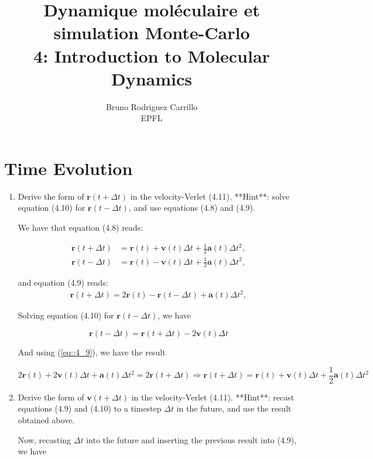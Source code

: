 \documentclass[12pt,letterpaper]{report}
\title{ Dynamique moléculaire et simulation Monte-Carlo \\ 4: Introduction to Molecular Dynamics}
\author{Bruno Rodriguez Carrillo \\ EPFL}
\begin{document}
	
	\maketitle
	\section*{Time Evolution}
		
	\begin{enumerate}
		\item 
		Derive the form of $\mathbf{r}(t + \Delta t)$ in the velocity-Verlet (4.11). **Hint**: solve equation (4.10) for  $\mathbf{r}(t - \Delta t)$, and use equations (4.8) and (4.9).
		
		We have that equation (4.8) reads: 
		
		\begin{align}				
			\mathbf{r}(t + \Delta t) &= \mathbf{r}(t) + \mathbf{v}(t)\Delta t + \frac{1}{2}\mathbf{a}(t)\Delta t^2, \\
			\mathbf{r}(t - \Delta t) &= \mathbf{r}(t) - \mathbf{v}(t)\Delta t + \frac{1}{2}\mathbf{a}(t)\Delta t^2,
			\label{eq::4_8}
		\end{align}
		
		and equation (4.9) reads:
		\begin{align}				
		\mathbf{r}(t + \Delta t) = 2\mathbf{r}(t) - \mathbf{r}(t - \Delta t) + \mathbf{a}(t) \Delta t^2,
		\label{eq::4_9}
		\end{align}
	
		Solving equation (4.10) for  $\mathbf{r}(t - \Delta t)$, we have
		
		$$
			\mathbf{r}(t - \Delta t) =  \mathbf{r}(t + \Delta t) - 2 \mathbf{v}(t) \Delta t			
		$$
		
		And using (\ref{eq::4_9}), we have the result
		
		$$
		2 \mathbf{r}(t) + 2\mathbf{v}(t) \Delta t + \mathbf{a}(t) \Delta t^{2} = 2\mathbf{r}(t + \Delta t)
		\Rightarrow
		\mathbf{r}(t + \Delta t) =  \mathbf{r}(t) + \mathbf{v}(t) \Delta t + \dfrac{1}{2}\mathbf{a}(t) \Delta t^{2}
		$$		
		
		\item
		Derive the form of $\mathbf{v}(t + \Delta t)$ in the velocity-Verlet (4.11). **Hint**: recast equations (4.9) and (4.10) to a	timestep $\Delta t$ in the future, and use the result obtained  above.
			
		Now, recasting $\Delta t$ into the future and inserting the previous result into (4.9), we have
		

\end{enumerate}
\end{document}
